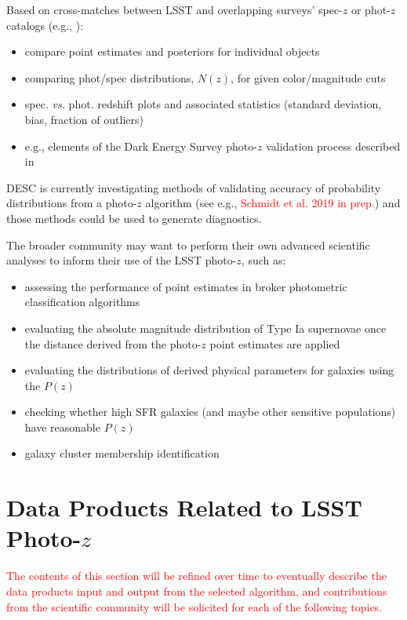 \documentclass[DM,lsstdraft,toc]{lsstdoc}
\begin{document}
Based on cross-matches between LSST and overlapping surveys' spec-$z$ or phot-$z$ catalogs (e.g., \cite{2019MNRAS.488.4565Z}):
\vspace{-15pt}
\begin{itemize}
\item compare point estimates and posteriors for individual objects
\item comparing phot/spec distributions, $N(z)$, for given color/magnitude cuts
\item spec. {\it vs.} phot. redshift plots and associated statistics (standard deviation, bias, fraction of outliers)
\item e.g., elements of the Dark Energy Survey photo-$z$ validation process described in \cite{2019MNRAS.482.2807C}
\end{itemize}

DESC is currently investigating methods of validating accuracy of probability distributions from a photo-$z$ algorithm (see e.g., \textcolor{red}{Schmidt et al. 2019 in prep.}) and those methods could be used to generate diagnostics.

The broader community may want to perform their own advanced scientific analyses to inform their use of the LSST photo-$z$, such as:
\vspace{-15pt}
\begin{itemize}
\item assessing the performance of point estimates in broker photometric classification algorithms
\item evaluating the absolute magnitude distribution of Type Ia supernovae once the distance derived from the photo-$z$ point estimates are applied
\item evaluating the distributions of derived physical parameters for galaxies using the $P(z)$
\item checking whether high SFR galaxies (and maybe other sensitive populations) have reasonable $P(z)$
\item galaxy cluster membership identification
\end{itemize}


\clearpage
\section{Data Products Related to LSST Photo-$z$}\label{sec:dp}

\textcolor{red}{The contents of this section will be refined over time to eventually describe the data products input and output from the selected algorithm, and contributions from the scientific community will be solicited for each of the following topics.}
\end{document}
